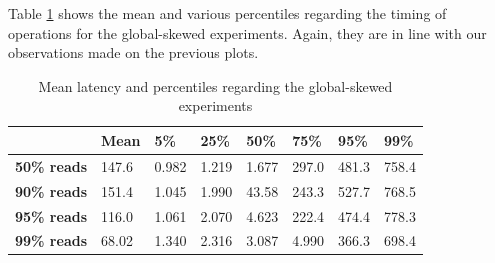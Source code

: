 Table \ref{tab:global-latencies-table} shows the mean and various percentiles regarding the timing of operations for the global-skewed experiments. Again, they are in line with our observations made on the previous plots.
\vfill
\begin{table}[!htb]
  \centering
  \begin{tabular}{l l l l l l l l}
    \hline
    & \textbf{Mean} & \textbf{5\%} & \textbf{25\%} & \textbf{50\%} & \textbf{75\%} & \textbf{95\%}& \textbf{99\%} \\
    \hline
    \textbf{50\% reads} & 147.6 & 0.982 & 1.219 & 1.677 & 297.0 & 481.3 & 758.4 \\
    \textbf{90\% reads} & 151.4 & 1.045 & 1.990 & 43.58 & 243.3 & 527.7 & 768.5 \\
    \textbf{95\% reads} & 116.0 & 1.061 & 2.070 & 4.623 & 222.4 & 474.4 & 778.3 \\
    \textbf{99\% reads} & 68.02 & 1.340 & 2.316 & 3.087 & 4.990 & 366.3 & 698.4 \\
    \hline
  \end{tabular}
  \caption{Mean latency and percentiles regarding the global-skewed experiments}\label{tab:global-latencies-table}
\end{table}

